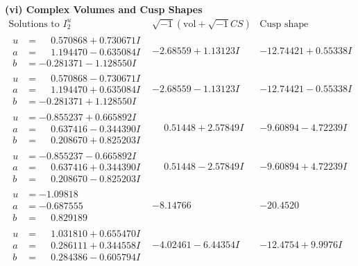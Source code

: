 \documentclass[1p]{elsarticle_modified}
\theoremstyle{definition}
\newcommand{\I}{\sqrt{-1}}
\begin{document}
\newpage\flushleft \textbf{(vi) Complex Volumes and Cusp Shapes}
$$\begin{array}{c|c|c}  
\text{Solutions to }I^u_{2}& \I (\text{vol} + \sqrt{-1}CS) & \text{Cusp shape}\\
 \hline 
\begin{aligned}
u &= \phantom{-}0.570868 + 0.730671 I \\
a &= \phantom{-}1.194470 - 0.635084 I \\
b &= -0.281371 - 1.128550 I\end{aligned}
 & -2.68559 + 1.13123 I & -12.74421 + 0.55338 I \\ \hline\begin{aligned}
u &= \phantom{-}0.570868 - 0.730671 I \\
a &= \phantom{-}1.194470 + 0.635084 I \\
b &= -0.281371 + 1.128550 I\end{aligned}
 & -2.68559 - 1.13123 I & -12.74421 - 0.55338 I \\ \hline\begin{aligned}
u &= -0.855237 + 0.665892 I \\
a &= \phantom{-}0.637416 - 0.344390 I \\
b &= \phantom{-}0.208670 + 0.825203 I\end{aligned}
 & \phantom{-}0.51448 + 2.57849 I & -9.60894 - 4.72239 I \\ \hline\begin{aligned}
u &= -0.855237 - 0.665892 I \\
a &= \phantom{-}0.637416 + 0.344390 I \\
b &= \phantom{-}0.208670 - 0.825203 I\end{aligned}
 & \phantom{-}0.51448 - 2.57849 I & -9.60894 + 4.72239 I \\ \hline\begin{aligned}
u &= -1.09818\phantom{ +0.000000I} \\
a &= -0.687555\phantom{ +0.000000I} \\
b &= \phantom{-}0.829189\phantom{ +0.000000I}\end{aligned}
 & -8.14766\phantom{ +0.000000I} & -20.4520\phantom{ +0.000000I} \\ \hline\begin{aligned}
u &= \phantom{-}1.031810 + 0.655470 I \\
a &= \phantom{-}0.286111 + 0.344558 I \\
b &= \phantom{-}0.284386 - 0.605794 I\end{aligned}
 & -4.02461 - 6.44354 I & -12.4754 + 9.9976 I \\ \hline\begin{aligned}

\end{aligned}
\end{array}$$
\end{document}
